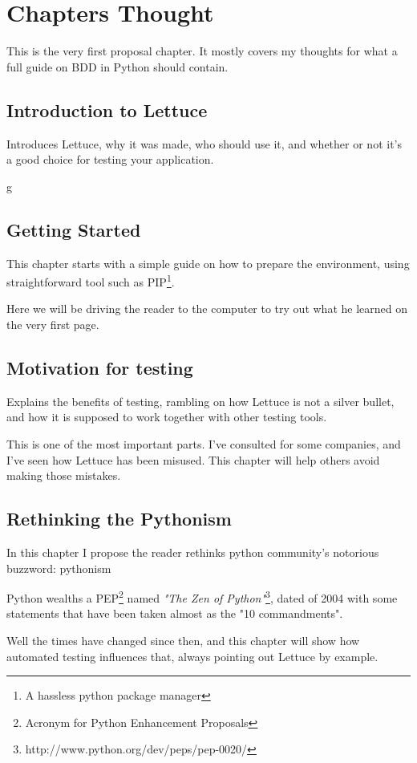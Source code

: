 \documentclass[letterpaper]{article}
\begin{document}
\section*{Chapters Thought}
This is the very first proposal chapter. It mostly covers my
thoughts for what a full guide on BDD in Python should contain.

\subsection*{Introduction to Lettuce}
\noindent
Introduces Lettuce, why it was made, who should use it, and
whether or not it's a good choice for testing your application.

g\subsection*{Getting Started}
This chapter starts with a simple guide on how to prepare the environment, using straightforward tool such as PIP\footnote{A hassless python package manager}.

Here we will be driving the reader to the computer to try out what he
learned on the very first page.

\subsection*{Motivation for testing}
Explains the benefits of testing, rambling on how Lettuce is not a
silver bullet, and how it is supposed to work together with other
testing tools.

This is one of the most important parts. I've consulted for some
companies, and I've seen how Lettuce has been misused. This chapter
will help others avoid making those mistakes.

\subsection*{Rethinking the Pythonism}
In this chapter I propose the reader rethinks python community's
notorious buzzword: pythonism

Python wealths a PEP\footnote{Acronym for Python Enhancement
 Proposals} named \textit{"The Zen of Python"}\footnote{http://www.python.org/dev/peps/pep-0020/}, dated of 2004 with some statements that have been taken almost as the "10 commandments".

Well the times have changed since then, and this chapter will show how
automated testing influences that, always pointing out Lettuce by
example.
\end{document}
